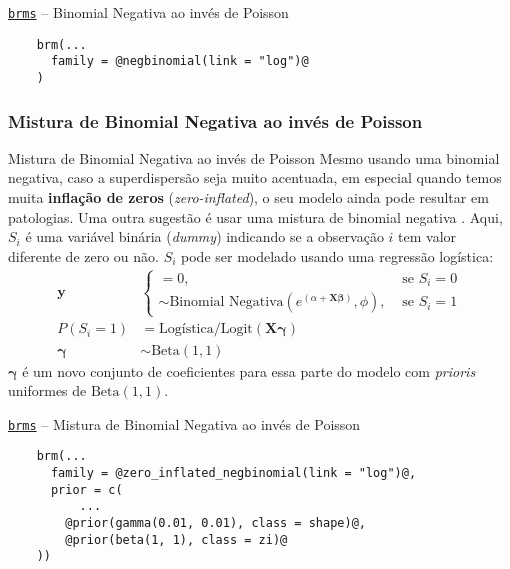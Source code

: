 \begin{frame}[fragile]{\href{https://paul-buerkner.github.io/brms/}{\texttt{brms}} -- Binomial Negativa ao invés de Poisson}
    \begin{lstlisting}
    brm(...
      family = @negbinomial(link = "log")@
    )
    \end{lstlisting}
\end{frame}

\subsubsection{Mistura de Binomial Negativa ao invés de Poisson}
\begin{frame}{Mistura de Binomial Negativa ao invés de Poisson}
    \small
    Mesmo usando uma binomial negativa, caso a superdispersão seja muito acentuada,
    em especial quando temos muita \textbf{inflação de zeros} (\textit{zero-inflated}),
    o seu modelo ainda pode resultar em patologias.
    Uma outra sugestão é usar uma mistura de binomial negativa \parencite{mcelreath2020statistical}.
    Aqui, $S_i$ é uma variável binária (\textit{dummy})
    indicando se a observação $i$ tem valor diferente de zero ou não.
    $S_i$ pode ser modelado usando uma regressão logística:
    $$
    \begin{aligned}
    \boldsymbol{y}
    & \begin{cases}
        = 0, &\text{ se } S_i = 0 \\
        \sim \text{Binomial Negativa} \left( e^{(\alpha + \mathbf{X} \boldsymbol{\beta})}, \phi \right), &\text{ se } S_i = 1
    \end{cases} \\
    P(S_i = 1) &= \text{Logística/Logit}(\mathbf{X} \boldsymbol{\gamma}) \\
    \boldsymbol{\gamma} &\sim \text{Beta}(1, 1)
    \end{aligned}
    $$
    \small
    $\boldsymbol{\gamma}$ é um novo conjunto de coeficientes para essa parte do modelo com
    \textit{prioris} uniformes de $\text{Beta} (1, 1)$.
\end{frame}

\begin{frame}[fragile]{\href{https://paul-buerkner.github.io/brms/}{\texttt{brms}} -- Mistura de Binomial Negativa ao invés de Poisson}
    \begin{lstlisting}
    brm(...
      family = @zero_inflated_negbinomial(link = "log")@,
      prior = c(
          ...
        @prior(gamma(0.01, 0.01), class = shape)@,
        @prior(beta(1, 1), class = zi)@
    ))
    \end{lstlisting}
\end{frame}

